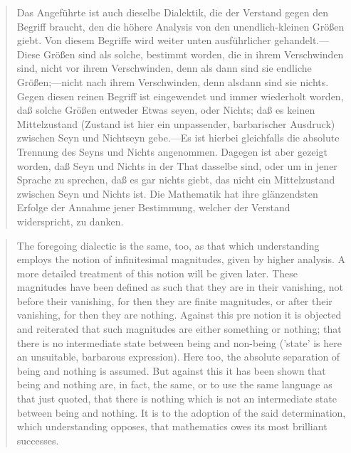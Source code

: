 \documentclass{article}
\begin{document}
\begin{quote}
    Das Angeführte ist auch dieselbe Dialektik, die der Verstand gegen den Begriff braucht, den die höhere Analysis von den unendlich-kleinen Größen giebt. Von diesem Begriffe wird weiter unten ausführlicher gehandelt.—Diese Größen sind als solche, bestimmt worden, die in ihrem Verschwinden sind, nicht vor ihrem Verschwinden, denn als dann sind sie endliche Größen;—nicht nach ihrem Verschwinden, denn alsdann sind sie nichts. Gegen diesen reinen Begriff ist eingewendet und immer wiederholt worden, daß solche Größen entweder Etwas seyen, oder Nichts; daß es keinen Mittelzustand (Zustand ist hier ein unpassender, barbarischer Ausdruck) zwischen Seyn und Nichtseyn gebe.—Es ist hierbei gleichfalls die absolute Trennung des Seyns und Nichts angenommen. Dagegen ist aber gezeigt worden, daß Seyn und Nichts in der That dasselbe sind, oder um in jener Sprache zu sprechen, daß es gar nichts giebt, das nicht ein Mittelzustand zwischen Seyn und Nichts ist. Die Mathematik hat ihre glänzendsten Erfolge der Annahme jener Bestimmung, welcher der Verstand widerspricht, zu danken.
\end{quote}

\begin{quote}
    The foregoing dialectic is the same, too, as that which understanding employs the notion of infinitesimal magnitudes, given by higher analysis. A more detailed treatment of this notion will be given later. These magnitudes have been defined as such that they are in their vanishing, not before their vanishing, for then they are finite magnitudes, or after their vanishing, for then they are nothing. Against this pre notion it is objected and reiterated that such magnitudes are either something or nothing; that there is no intermediate state between being and non-being ('state' is here an unsuitable, barbarous expression). Here too, the absolute separation of being and nothing is assumed. But against this it has been shown that being and nothing are, in fact, the same, or to use the same language as that just quoted, that there is nothing which is not an intermediate state between being and nothing. It is to the adoption of the said determination, which understanding opposes, that mathematics owes its most brilliant successes.
\end{quote}    
\end{document}
